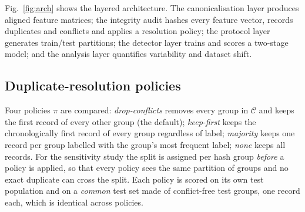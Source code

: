 \documentclass[conference]{IEEEtran}
\begin{document}
Fig.~\ref{fig:arch} shows the layered architecture. The canonicalisation layer produces aligned feature matrices; the integrity audit hashes every feature vector, records duplicates and conflicts and applies a resolution policy; the protocol layer generates train/test partitions; the detector layer trains and scores a two-stage model; and the analysis layer quantifies variability and dataset shift.

\subsection{Duplicate-resolution policies}
Four policies $\pi$ are compared: \emph{drop-conflicts} removes every group in $\mathcal{C}$ and keeps the first record of every other group (the default); \emph{keep-first} keeps the chronologically first record of every group regardless of label; \emph{majority} keeps one record per group labelled with the group's most frequent label; \emph{none} keeps all records. For the sensitivity study the split is assigned per hash group \emph{before} a policy is applied, so that every policy sees the same partition of groups and no exact duplicate can cross the split. Each policy is scored on its own test population and on a \emph{common} test set made of conflict-free test groups, one record each, which is identical across policies.
\end{document}
